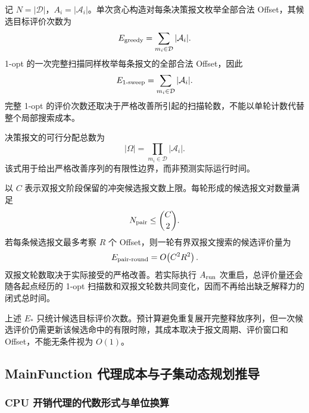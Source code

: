 \documentclass[UTF8,a4paper,twoside,zihao=-4]{ctexart}
\numberwithin{equation}{section}
\numberwithin{figure}{section}
\numberwithin{table}{section}
\theoremstyle{definition}
\newcommand{\Oset}{\mathcal{A}}
\numberwithin{algocf}{section}
\begin{document}
记 $N=|\mathcal D|$，$A_i=|\Oset_i|$。单次贪心构造对每条决策报文枚举全部合法 Offset，其候选目标评价次数为
\begin{equation}
 E_{\rm greedy}
 =
 \sum_{m_i\in\mathcal D}|\Oset_i|.
\label{eq:gcls-greedy-evaluations}
\end{equation}
1-opt 的一次完整扫描同样枚举每条报文的全部合法 Offset，因此
\begin{equation}
 E_{\rm 1\text{-}sweep}
 =
 \sum_{m_i\in\mathcal D}|\Oset_i|.
\label{eq:gcls-one-sweep-evaluations}
\end{equation}
完整 1-opt 的评价次数还取决于严格改善所引起的扫描轮数，不能以单轮计数代替整个局部搜索成本。

决策报文的可行分配总数为
\begin{equation}
 |\Omega|
 =
 \prod_{m_i\in\mathcal D}|\Oset_i|.
\label{eq:gcls-search-space-size}
\end{equation}
该式用于给出严格改善序列的有限性边界，而非预测实际运行时间。

以 $C$ 表示双报文阶段保留的冲突候选报文数上限。每轮形成的候选报文对数量满足
\begin{equation}
 N_{\rm pair}
 \le
 \binom{C}{2}.
\label{eq:gcls-pair-count}
\end{equation}
若每条候选报文最多考察 $R$ 个 Offset，则一轮有界双报文搜索的候选评价量为
\begin{equation}
 E_{\rm pair\text{-}round}
 =
 O\!\left(C^2R^2\right).
\label{eq:gcls-pair-round-complexity}
\end{equation}
双报文轮数取决于实际接受的严格改善。若实际执行 $A_{\rm run}$ 次重启，总评价量还会随各起点经历的 1-opt 扫描数和双报文轮数共同变化，因而不再给出缺乏解释力的闭式总时间。

上述 $E_*$ 只统计候选目标评价次数。预计算避免重复展开完整释放序列，但一次候选评价仍需更新该候选命中的有限时隙，其成本取决于报文周期、评价窗口和 Offset，不能无条件视为 $O(1)$。
\subsection{MainFunction 代理成本与子集动态规划推导}
\label{subsec:appendix-mainfunction-derivations}

\subsubsection{CPU 开销代理的代数形式与单位换算}
\label{subsubsec:appendix-cpu-proxy-derivation}
\end{document}
